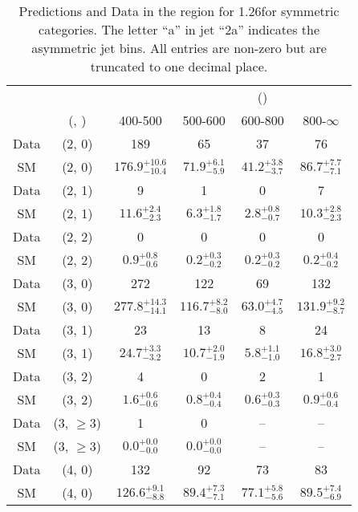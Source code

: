 \begin{table}[h!]
\tiny
\centering
\caption{Predictions and Data in the \gj region for 1.26\ifb for symmetric categories. The letter ``a'' in jet \eg ``2a''  indicates the asymmetric jet bins. All entries are non-zero but are truncated to one decimal place.\label{tab:predall_gj_comb_sym}}
\begin{tabular}
{cccccc}
	\hline\hline
&	&	& \multicolumn{4}{c}{\scalht (\gev)}\\ 
	&	 (\njet, \nb) & 400-500 & 500-600 & 600-800 & 800-$\infty$ \\ [0.8ex] 
\hline
	Data & (2, 0) & 189 & 65 & 37 & 76 \\[0.5ex] 
	SM & (2, 0) & $176.9^{+ 10.6 }_{- 10.4 }$ & $71.9^{+ 6.1 }_{- 5.9 }$ & $41.2^{+ 3.8 }_{- 3.7 }$ & $86.7^{+ 7.7 }_{- 7.1 }$ \\[0.5ex] 
	Data & (2, 1) & 9 & 1 & 0 & 7 \\[0.5ex] 
	SM & (2, 1) & $11.6^{+ 2.4 }_{- 2.3 }$ & $6.3^{+ 1.8 }_{- 1.7 }$ & $2.8^{+ 0.8 }_{- 0.7 }$ & $10.3^{+ 2.8 }_{- 2.3 }$ \\[0.5ex] 
	Data & (2, 2) & 0 & 0 & 0 & 0 \\[0.5ex] 
	SM & (2, 2) & $0.9^{+ 0.8 }_{- 0.6 }$ & $0.2^{+ 0.3 }_{- 0.2 }$ & $0.2^{+ 0.3 }_{- 0.2 }$ & $0.2^{+ 0.4 }_{- 0.2 }$ \\[0.5ex] 
	Data & (3, 0) & 272 & 122 & 69 & 132 \\[0.5ex] 
	SM & (3, 0) & $277.8^{+ 14.3 }_{- 14.1 }$ & $116.7^{+ 8.2 }_{- 8.0 }$ & $63.0^{+ 4.7 }_{- 4.5 }$ & $131.9^{+ 9.2 }_{- 8.7 }$ \\[0.5ex] 
	Data & (3, 1) & 23 & 13 & 8 & 24 \\[0.5ex] 
	SM & (3, 1) & $24.7^{+ 3.3 }_{- 3.2 }$ & $10.7^{+ 2.0 }_{- 1.9 }$ & $5.8^{+ 1.1 }_{- 1.0 }$ & $16.8^{+ 3.0 }_{- 2.7 }$ \\[0.5ex] 
	Data & (3, 2) & 4 & 0 & 2 & 1 \\[0.5ex] 
	SM & (3, 2) & $1.6^{+ 0.6 }_{- 0.6 }$ & $0.8^{+ 0.4 }_{- 0.4 }$ & $0.6^{+ 0.3 }_{- 0.3 }$ & $0.9^{+ 0.6 }_{- 0.4 }$ \\[0.5ex] 
	Data & (3, $\ge3$) & 1 & 0 & -- & -- \\[0.5ex] 
	SM & (3, $\ge3$) & $0.0^{+ 0.0 }_{- 0.0 }$ & $0.0^{+ 0.0 }_{- 0.0 }$ & -- & -- \\[0.5ex] 
	Data & (4, 0) & 132 & 92 & 73 & 83 \\[0.5ex] 
	SM & (4, 0) & $126.6^{+ 9.1 }_{- 8.8 }$ & $89.4^{+ 7.3 }_{- 7.1 }$ & $77.1^{+ 5.8 }_{- 5.6 }$ & $89.5^{+ 7.4 }_{- 6.9 }$ \\[0.5ex] 

\end{tabular}
\end{table}
